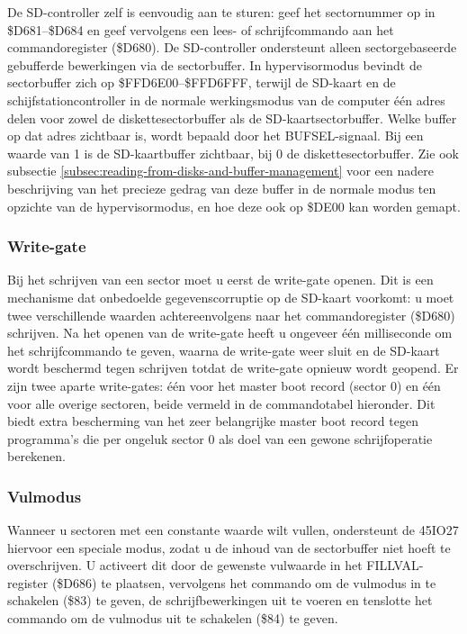 De SD-controller zelf is eenvoudig aan te sturen: geef het sectornummer op in \$D681--\$D684 en geef vervolgens een lees- of schrijfcommando aan het commandoregister (\$D680). De SD-controller ondersteunt alleen sectorgebaseerde gebufferde bewerkingen via de sectorbuffer. In hypervisormodus bevindt de sectorbuffer zich op \$FFD6E00--\$FFD6FFF, terwijl de SD-kaart en de schijfstationcontroller in de normale werkingsmodus van de computer één adres delen voor zowel de diskettesectorbuffer als de SD-kaartsectorbuffer. Welke buffer op dat adres zichtbaar is, wordt bepaald door het BUFSEL-signaal. Bij een waarde van 1 is de SD-kaartbuffer zichtbaar, bij 0 de diskettesectorbuffer. Zie ook subsectie \vref{subsec:reading-from-disks-and-buffer-management} voor een nadere beschrijving van het precieze gedrag van deze buffer in de normale modus ten opzichte van de hypervisormodus, en hoe deze ook op \$DE00 kan worden gemapt.

\subsubsection{Write-gate}

Bij het schrijven van een sector moet u eerst de write-gate openen. Dit is een mechanisme dat onbedoelde gegevenscorruptie op de SD-kaart voorkomt: u moet twee verschillende waarden achtereenvolgens naar het commandoregister (\$D680) schrijven. Na het openen van de write-gate heeft u ongeveer één milliseconde om het schrijfcommando te geven, waarna de write-gate weer sluit en de SD-kaart wordt beschermd tegen schrijven totdat de write-gate opnieuw wordt geopend. Er zijn twee aparte write-gates: één voor het master boot record (sector 0) en één voor alle overige sectoren, beide vermeld in de commandotabel hieronder. Dit biedt extra bescherming van het zeer belangrijke master boot record tegen programma's die per ongeluk sector 0 als doel van een gewone schrijfoperatie berekenen.

\subsubsection{Vulmodus}

Wanneer u sectoren met een constante waarde wilt vullen, ondersteunt de 45IO27 hiervoor een speciale modus, zodat u de inhoud van de sectorbuffer niet hoeft te overschrijven. U activeert dit door de gewenste vulwaarde in het FILLVAL-register (\$D686) te plaatsen, vervolgens het commando om de vulmodus in te schakelen (\$83) te geven, de schrijfbewerkingen uit te voeren en tenslotte het commando om de vulmodus uit te schakelen (\$84) te geven.

